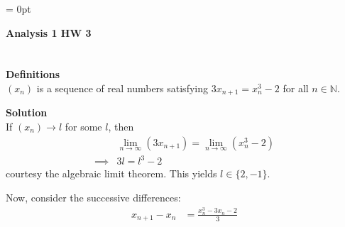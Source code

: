 \documentclass[12pt]{article}
\begin{document}

\setcounter{section}{0} %
\renewcommand{\thesection}{\arabic{section}}


\parindent = 0pt


      {\bf Analysis 1 HW 3} 




\section{}
 {\bf Definitions}\\
$(x_{n})$ is a sequence of real numbers satisfying $3x_{n+1} = {x_{n}^{3}-2}$ for all $n\in \mathbb{N}$.

      {\bf Solution}\\
If $(x_{n})\to l$ for some $l$, then
\begin{align*}
               & \lim_{ n \to \infty } (3x_{n+1}) = \lim_{ n \to \infty } (x_{n}^{3}-2) \\
      \implies & 3l=l^{3}-2
\end{align*}
courtesy the algebraic limit theorem. This yields $l\in \{ 2, -1 \}$.

Now, consider the successive differences:
\begin{align}
      x_{n+1}-x_{n} & = \frac{{x_{n}^{3}-3x_{n}-2}}{3}
\end{align}
\end{document}
